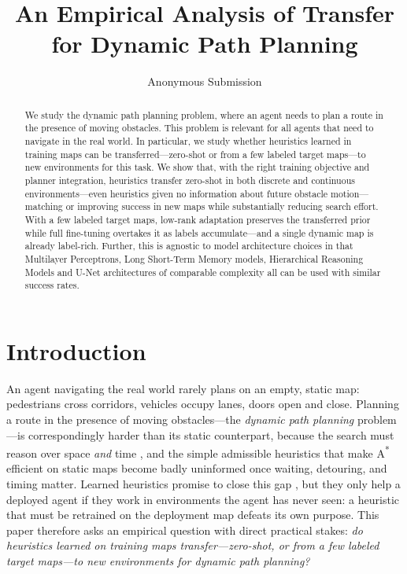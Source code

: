 \documentclass[letterpaper]{article} %
\title{An Empirical Analysis of Transfer for Dynamic Path Planning}
\author{
    Anonymous Submission
}
\begin{document}
\maketitle

\begin{abstract}
We study the dynamic path planning problem, where an agent needs to plan a route in the presence of moving obstacles. This problem is relevant for all agents that need to navigate in the real world. In particular, we study whether heuristics learned in training maps can be transferred---zero-shot or from a few labeled target maps---to new environments for this task. We show that, with the right training objective and planner integration, heuristics transfer zero-shot in both discrete and continuous environments---even heuristics given no information about future obstacle motion---matching or improving success in new maps while substantially reducing search effort. With a few labeled target maps, low-rank adaptation preserves the transferred prior while full fine-tuning overtakes it as labels accumulate---and a single dynamic map is already label-rich. Further, this is agnostic to model architecture choices in that Multilayer Perceptrons, Long Short-Term Memory models, Hierarchical Reasoning Models and U-Net architectures of comparable complexity all can be used with similar success rates.
\end{abstract}


\section{Introduction}

An agent navigating the real world rarely plans on an empty, static map: pedestrians cross corridors, vehicles occupy lanes, doors open and close. Planning a route in the presence of moving obstacles---the \emph{dynamic path planning} problem---is correspondingly harder than its static counterpart, because the search must reason over space \emph{and} time \citep{silver2005cooperative,phillips2011sipp}, and the simple admissible heuristics that make A\textsuperscript{*} \citep{hart1968astar} efficient on static maps become badly uninformed once waiting, detouring, and timing matter. Learned heuristics promise to close this gap \citep{arfaee2011bootstrap,bhardwaj2017sail,yonetani2021neuralastar}, but they only help a deployed agent if they work in environments the agent has never seen: a heuristic that must be retrained on the deployment map defeats its own purpose. This paper therefore asks an empirical question with direct practical stakes: \emph{do heuristics learned on training maps transfer---zero-shot, or from a few labeled target maps---to new environments for dynamic path planning?}
\end{document}
